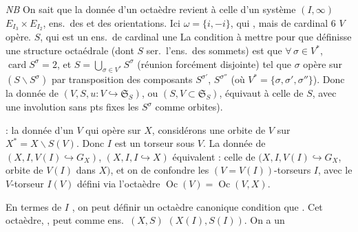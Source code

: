 \documentclass[11pt,a4paper]{article}
\begin{document}
\emph{NB} On sait que la donnée d'un octaèdre   revient à celle d'un système $(I, \infty)$ \struck{\ill{}}
$E_{I_{3}} \times E_{I_{2}}$, ens.\ des  et des
orientations. Ici $\omega = \{i, -i\}$, \struck{\ill{}}  qui   \ill{}, mais \ill{} de
cardinal 6  $V$ opère. $S$, qui est un ens.\ de
 cardinal \ill{}  une
La condition à mettre \struck{$*$} pour que  définisse une
structure octaédrale (dont $S$ ser.\ l'ens.\ des sommets) \struck{\ill{}} est
que $\forall\, \sigma \in V^{*}$, \struck{\ill{}}
$\operatorname{card} S^{\sigma} = 2$, et
$S = \bigcup_{\sigma \in V^{*}} S^{\sigma}$ (réunion forcément disjointe) tel
 que $\sigma$ opère sur $(S \smallsetminus S^{\sigma})$
par transposition  \struck{\ill{}} \ill{} des
composants $S^{\sigma'}$, $S^{\sigma''}$ (où $V^{*} = \{\sigma, \sigma',
\sigma''\}$). Donc la donnée de \struck{\ill{}} $(V, S, u : V \hookrightarrow
\mathfrak{S}_{S})$, ou $(S, V \subset \mathfrak{S}_{S})$, équivaut à celle de
$S$, avec une involution sans pts fixes \ill{} \ill{}  les
$S^{\sigma}$ comme orbites).

 : la donnée d'un $V$ qui opère  sur $X$,
considérons une orbite  de $V$ sur $X^{*} = X \smallsetminus S(V)$.
Donc $I$ est un torseur sous $V$. La donnée de $(X, I, V(I) \hookrightarrow
G_{X})$, $(X, I, I \hookrightarrow X)$ équivalent : celle de
$(X, I, V(I) \hookrightarrow G_{X}$, orbite de $V(I)$ dans $X)$, et on
  de confondre les $(V = V(I))$-torseurs $I$,
avec le $V$-torseur $I(V)$  défini via l'octaèdre
$\operatorname{Oc}(V) = \operatorname{Oc}(V, X)$.

En termes de $I$ , on peut définir un octaèdre
 \ill{}  canonique    condition que \ill{} . Cet \struck{\ill{}} octaèdre, , peut  comme ens.\ $(X, S)$ \ill{}
\struck{\ill{}}  $(X(I), S(I))$. On a un 
\end{document}
